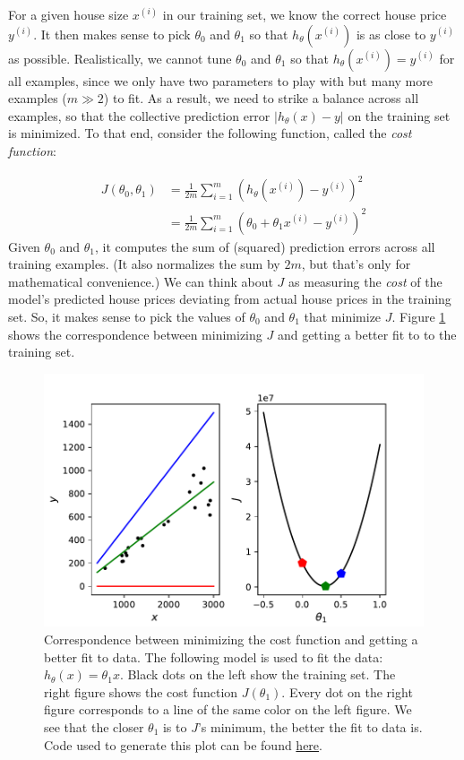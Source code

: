 \documentclass{article}
\begin{document}
For a given house size $x^{(i)}$ in our training set, we know the correct house price $y^{(i)}$. It then makes sense to pick $\theta_0$ and $\theta_1$ so that $h_{\theta}(x^{(i)})$ is as close to $y^{(i)}$ as possible. Realistically, we cannot tune $\theta_0$ and $\theta_1$ so that $h_{\theta}(x^{(i)})=y^{(i)}$ for all examples, since we only have two parameters to play with but many more examples ($m \gg 2$) to fit. As a result, we need to strike a balance across all examples, so that the collective prediction error $|h_{\theta}(x) - y|$ on the training set is minimized. To that end, consider the following function, called the \textit{cost function}:

\begin{align}
    J(\theta_0, \theta_1) &= \frac{1}{2m}\sum_{i=1}^{m}(h_{\theta}(x^{(i)}) - y^{(i)})^2
    \label{linreg-eq:costfunc}\\
    &= \frac{1}{2m}\sum_{i=1}^{m}(\theta_0 + \theta_1 x^{(i)} - y^{(i)})^2
    \label{linreg-eq:univar-costfunc}
\end{align}
Given $\theta_0$ and $\theta_1$, it computes the sum of (squared) prediction errors across all training examples. (It also normalizes the sum by $2m$, but that's only for mathematical convenience.) We can think about $J$ as measuring the \textit{cost} of the model's predicted house prices deviating from actual house prices in the training set. So, it makes sense to pick the values of $\theta_0$ and $\theta_1$ that minimize $J$. Figure \ref{linreg-fig:costfunc} shows the correspondence between minimizing $J$ and getting a better fit to to the training set. 

\begin{figure}[ht]
\centering
\includegraphics[scale=0.7]{images/lin_reg/costfunc.pdf}
\caption{Correspondence between minimizing the cost function and getting a better fit to data. The following model is used to fit the data: $h_{\theta}(x) = \theta_1 x$. Black dots on the left show the training set. The right figure shows the cost function $J(\theta_1)$. Every dot on the right figure corresponds to a line of the same color on the left figure. We see that the closer $\theta_1$ is to $J$'s minimum, the better the fit to data is. Code used to generate this plot can be found \href{https://github.com/siavashaslanbeigi/ml_notes_supp/blob/master/lin_reg/costfunction.ipynb}{here}.}
\label{linreg-fig:costfunc}
\end{figure}
\end{document}
